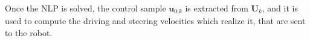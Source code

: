 Once the NLP is solved, the control sample $\bm{u}_{0|k}$ is extracted from $\bm{U}_k$, and it is used to compute the driving and steering velocities which realize it, that are sent to the robot.






